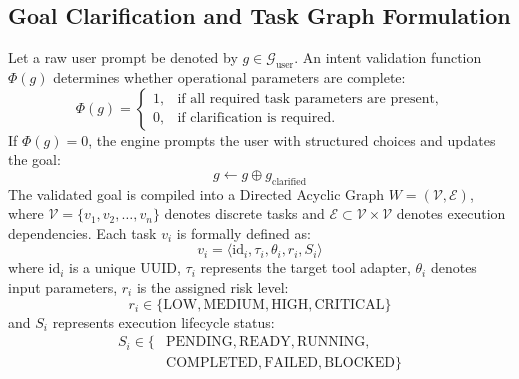 \documentclass[conference]{IEEEtran}
\begin{document}
\subsection{Goal Clarification and Task Graph Formulation}
Let a raw user prompt be denoted by $g \in \mathcal{G}_{\text{user}}$. An intent validation function $\Phi(g)$ determines whether operational parameters are complete:
\begin{equation}
\Phi(g) =
\begin{cases}
1, & \text{if all required task parameters are present,} \\
0, & \text{if clarification is required.}
\end{cases}
\end{equation}
If $\Phi(g)=0$, the engine prompts the user with structured choices and updates the goal:
\begin{equation}
g \leftarrow g \oplus g_{\text{clarified}}
\end{equation}
The validated goal is compiled into a Directed Acyclic Graph $W = (\mathcal{V}, \mathcal{E})$, where $\mathcal{V} = \{v_1, v_2, \dots, v_n\}$ denotes discrete tasks and $\mathcal{E} \subset \mathcal{V} \times \mathcal{V}$ denotes execution dependencies. Each task $v_i$ is formally defined as:
\begin{equation}
v_i = \langle \text{id}_i, \tau_i, \theta_i, r_i, S_i \rangle
\end{equation}
where $\text{id}_i$ is a unique UUID, $\tau_i$ represents the target tool adapter, $\theta_i$ denotes input parameters, $r_i$ is the assigned risk level:
\begin{equation}
r_i \in \{\text{LOW}, \text{MEDIUM}, \text{HIGH}, \text{CRITICAL}\}
\end{equation}
and $S_i$ represents execution lifecycle status:
\begin{equation}
\begin{aligned}
S_i \in \{&\text{PENDING}, \text{READY}, \text{RUNNING}, \\
          &\text{COMPLETED}, \text{FAILED}, \text{BLOCKED}\}
\end{aligned}
\end{equation}
\end{document}

